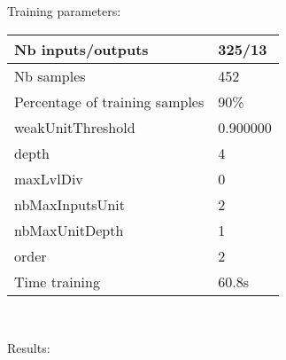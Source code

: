 Training parameters:\\
\begin{center}
\begin{tabular}{|l|l|}
\hline
Nb inputs/outputs&325/13\\
\hline
Nb samples&452\\
\hline
Percentage of training samples&90\%\\
\hline
weakUnitThreshold&0.900000\\
\hline
depth&4\\
\hline
maxLvlDiv&0\\
\hline
nbMaxInputsUnit&2\\
\hline
nbMaxUnitDepth&1\\
\hline
order&2\\
\hline
Time training&60.8s\\
\hline
\end{tabular}\\
\end{center}\newline
Results:
